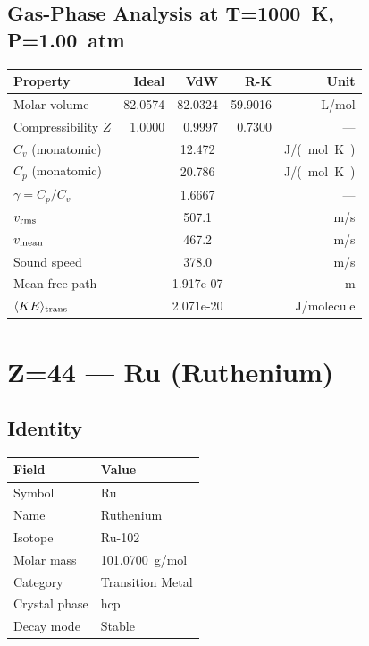 \documentclass[11pt,a4paper]{article}
\begin{document}
\subsection{Gas-Phase Analysis at T=\SI{1000}{K}, P=\SI{1.00}{atm}}
\begin{tabular}{lrrrr}
  \toprule
  Property & Ideal & VdW & R-K & Unit \\
  \midrule
  Molar volume & 82.0574 & 82.0324 & 59.9016 & \si{L/mol} \\
  Compressibility $Z$ & 1.0000 & 0.9997 & 0.7300 & --- \\
  \midrule
  $C_v$ (monatomic) & \multicolumn{3}{c}{12.472} & \si{J/(mol.K)} \\
  $C_p$ (monatomic) & \multicolumn{3}{c}{20.786} & \si{J/(mol.K)} \\
  $\gamma = C_p/C_v$ & \multicolumn{3}{c}{1.6667} & --- \\
  $v_{\rm rms}$ & \multicolumn{3}{c}{507.1} & \si{m/s} \\
  $v_{\rm mean}$ & \multicolumn{3}{c}{467.2} & \si{m/s} \\
  Sound speed & \multicolumn{3}{c}{378.0} & \si{m/s} \\
  Mean free path & \multicolumn{3}{c}{1.917e-07} & \si{m} \\
  $\langle KE \rangle_{\rm trans}$ & \multicolumn{3}{c}{2.071e-20} & \si{J/molecule} \\
  \bottomrule
\end{tabular}

\newpage

\section{Z=44 --- Ru (Ruthenium)}
\label{sec:Z44}

\subsection{Identity}
\begin{tabular}{ll}
  \toprule
  Field & Value \\
  \midrule
  Symbol & Ru \\
  Name & Ruthenium \\
  Isotope & Ru-102 \\
  Molar mass & \SI{101.0700}{g/mol} \\
  Category & Transition Metal \\
  Crystal phase & hcp \\
  Decay mode & Stable \\
  \bottomrule
\end{tabular}
\end{document}
